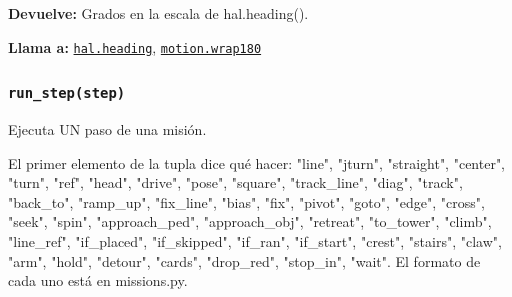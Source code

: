 \par{}\par\smallskip
\noindent\textbf{Devuelve:} Grados en la escala de hal.heading().\par
\noindent\textbf{Llama a:} \hyperref[fn:hal:heading]{\texttt{hal.heading}}, \hyperref[fn:motion:wrap180]{\texttt{motion.wrap180}}\par

\subsubsection{\texttt{run\_\allowbreak{}step(step)}}\label{fn:autonomous:run-step}
\noindent Ejecuta UN paso de una misión.

El primer elemento de la tupla dice qué hacer: "line", "jturn", "straight", "center", "turn", "ref", "head", "drive", "pose", "square", "track\_line", "diag", "track", "back\_to", "ramp\_up", "fix\_line", "bias", "fix", "pivot", "goto", "edge", "cross", "seek", "spin", "approach\_ped", "approach\_obj", "retreat", "to\_tower", "climb", "line\_ref", "if\_placed", "if\_skipped", "if\_ran", "if\_start", "crest", "stairs", "claw", "arm", "hold", "detour", "cards", "drop\_red", "stop\_in", "wait". El formato de cada uno está en missions.py.

